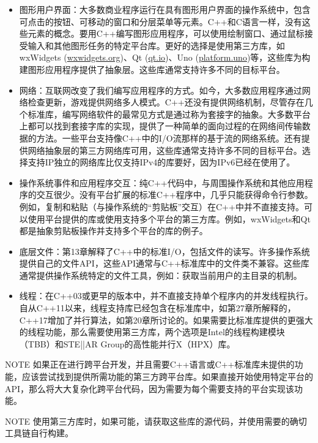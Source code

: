 \begin{itemize}
\item
图形用户界面：大多数商业程序运行在具有图形用户界面的操作系统中，包含可点击的按钮、可移动的窗口和分层菜单等元素。C++和C语言一样，没有这些元素的概念。要用C++编写图形应用程序，可以使用绘制窗口、通过鼠标接受输入和其他图形任务的特定平台库。更好的选择是使用第三方库，如wxWidgets (\url{wxwidgets.org})、Qt (\url{qt.io})、Uno (\url{platform.uno})等，这些库为构建图形应用程序提供了抽象层。这些库通常支持许多不同的目标平台。

\item
网络：互联网改变了我们编写应用程序的方式。如今，大多数应用程序通过网络检查更新，游戏提供网络多人模式。C++还没有提供网络机制，尽管存在几个标准库，编写网络软件的最常见方式是通过称为套接字的抽象。大多数平台上都可以找到套接字库的实现，提供了一种简单的面向过程的在网络间传输数据的方法。一些平台支持像C++中的I/O流那样的基于流的网络系统。还有提供网络抽象层的第三方网络库可用，这些库通常支持许多不同的目标平台。选择支持IP独立的网络库比仅支持IPv4的库要好，因为IPv6已经在使用了。

\item
操作系统事件和应用程序交互：纯C++代码中，与周围操作系统和其他应用程序的交互很少。没有平台扩展的标准C++程序中，几乎只能获得命令行参数。例如，复制和粘贴（与操作系统的“剪贴板”交互）在C++中并不直接支持。可以使用平台提供的库或使用支持多个平台的第三方库。例如，wxWidgets和Qt都是抽象剪贴板操作并支持多个平台的库的例子。

\item
底层文件：第13章解释了C++中的标准I/O，包括文件的读写。许多操作系统提供自己的文件API，这些API通常与C++标准库中的文件类不兼容。这些库通常提供操作系统特定的文件工具，例如：获取当前用户的主目录的机制。

\item
线程：在C++03或更早的版本中，并不直接支持单个程序内的并发线程执行。自从C++11以来，线程支持库已经包含在标准库中，如第27章所解释的，C++17增加了并行算法，如第20章所讨论的。如果需要比标准库提供的更强大的线程功能，那么需要使用第三方库，两个选项是Intel的线程构建模块（TBB）和STE||AR Group的高性能并行X（HPX）库。
\end{itemize}

\begin{myNotic}{NOTE}
如果正在进行跨平台开发，并且需要C++语言或C++标准库未提供的功能，应该尝试找到提供所需功能的第三方跨平台库。如果直接开始使用特定平台的API，那么将大大复杂化跨平台代码，因为需要为每个需要支持的平台实现该功能。
\end{myNotic}

\begin{myNotic}{NOTE}
使用第三方库时，如果可能，请获取这些库的源代码，并使用需要的确切工具链自行构建。
\end{myNotic}

















